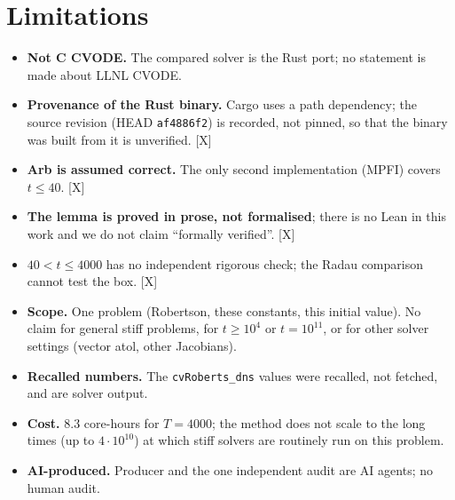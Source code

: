 \documentclass[11pt]{article}
\newcommand{\tier}[1]{\textsf{[#1]}}
\newcommand{\tX}{\tier{X}}
\theoremstyle{remark}
\begin{document}
\section{Limitations}\label{sec:lim}
\begin{itemize}\setlength\itemsep{1pt}
\item \textbf{Not C CVODE.} The compared solver is the Rust port; no statement is made about LLNL CVODE.
\item \textbf{Provenance of the Rust binary.} Cargo uses a path dependency; the source revision (HEAD \texttt{af4886f2}) is recorded, not pinned, so that the binary was built from it is unverified. \tX{}
\item \textbf{Arb is assumed correct.} The only second implementation (MPFI) covers $t\le40$. \tX{}
\item \textbf{The lemma is proved in prose, not formalised}; there is no Lean in this work and we do not claim ``formally verified''. \tX{}
\item \textbf{$40<t\le4000$} has no independent rigorous check; the Radau comparison cannot test the box. \tX{}
\item \textbf{Scope.} One problem (Robertson, these constants, this initial value). No claim for general stiff problems, for $t\ge10^4$ or $t=10^{11}$, or for other solver settings (vector atol, other Jacobians).
\item \textbf{Recalled numbers.} The \texttt{cvRoberts\_dns} values were recalled, not fetched, and are solver output.
\item \textbf{Cost.} $8.3$ core-hours for $T=4000$; the method does not scale to the long times (up to $4\cdot10^{10}$) at which stiff solvers are routinely run on this problem.
\item \textbf{AI-produced.} Producer and the one independent audit are AI agents; no human audit.
\end{itemize}

\end{document}
